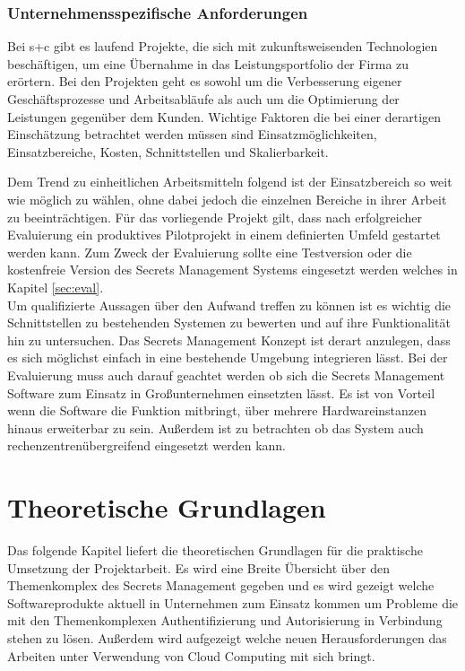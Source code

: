 \documentclass[
book,
a4paper,   
titlepage,  
halfparskip,
12pt        
]{scrartcl}
\begin{document}
\begin{onehalfspacing}
\subsubsection{Unternehmensspezifische Anforderungen}
Bei s+c gibt es laufend Projekte, die sich mit zukunftsweisenden Technologien beschäftigen, um eine Übernahme in das Leistungsportfolio der Firma zu erörtern. Bei den Projekten geht es sowohl um die Verbesserung eigener Geschäftsprozesse und Arbeitsabläufe als auch um die Optimierung der Leistungen gegenüber dem Kunden. Wichtige Faktoren die bei einer derartigen Einschätzung betrachtet werden müssen sind Einsatzmöglichkeiten, Einsatzbereiche, Kosten, Schnittstellen und Skalierbarkeit. 
                                                                                                          
Dem Trend zu einheitlichen Arbeitsmitteln folgend ist der Einsatzbereich so weit wie möglich zu wählen, ohne dabei jedoch die einzelnen Bereiche in ihrer Arbeit zu beeinträchtigen. Für das vorliegende Projekt gilt, dass nach erfolgreicher Evaluierung ein produktives Pilotprojekt in einem definierten Umfeld gestartet werden kann. Zum Zweck der Evaluierung sollte eine Testversion oder die kostenfreie Version des Secrets Management Systems eingesetzt werden welches in Kapitel \vref{sec:eval}.\\
Um qualifizierte Aussagen über den Aufwand treffen zu können ist es wichtig die Schnittstellen zu bestehenden Systemen zu bewerten und auf ihre Funktionalität hin zu untersuchen. Das Secrets Management Konzept ist derart anzulegen, dass es sich möglichst einfach in eine bestehende Umgebung integrieren lässt. Bei der Evaluierung muss auch darauf geachtet werden ob sich die Secrets Management Software zum Einsatz in Großunternehmen einsetzten lässt. Es ist von Vorteil wenn die Software die Funktion mitbringt, über mehrere Hardwareinstanzen hinaus erweiterbar zu sein. Außerdem ist zu betrachten ob das System auch rechenzentrenübergreifend eingesetzt werden kann.

\newpage
\section{Theoretische Grundlagen}
\label{sec:grund}
Das folgende Kapitel liefert die theoretischen Grundlagen für die praktische Umsetzung der Projektarbeit. Es wird eine Breite Übersicht über den Themenkomplex des Secrets Management gegeben und es wird gezeigt welche Softwareprodukte aktuell in Unternehmen zum Einsatz kommen um Probleme die mit den Themenkomplexen Authentifizierung und Autorisierung in Verbindung stehen zu lösen. Außerdem wird aufgezeigt welche neuen Herausforderungen das Arbeiten unter Verwendung von Cloud Computing mit sich bringt. 


\end{onehalfspacing}
\end{document}
